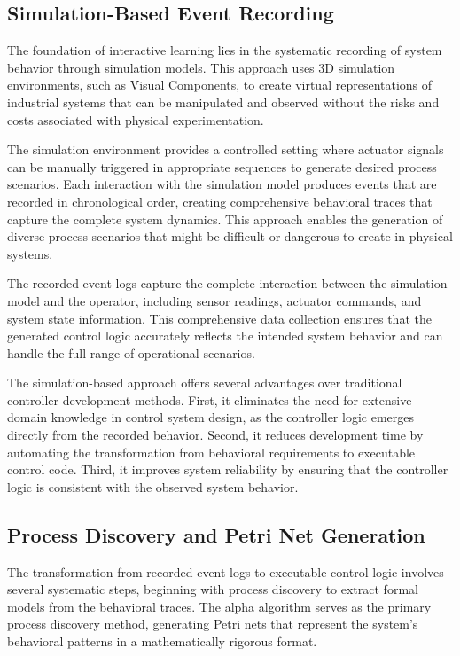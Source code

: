 \subsection{Simulation-Based Event Recording}

The foundation of interactive learning lies in the systematic recording of system behavior through simulation models. This approach uses 3D simulation environments, such as Visual Components, to create virtual representations of industrial systems that can be manipulated and observed without the risks and costs associated with physical experimentation.

The simulation environment provides a controlled setting where actuator signals can be manually triggered in appropriate sequences to generate desired process scenarios. Each interaction with the simulation model produces events that are recorded in chronological order, creating comprehensive behavioral traces that capture the complete system dynamics. This approach enables the generation of diverse process scenarios that might be difficult or dangerous to create in physical systems.



The recorded event logs capture the complete interaction between the simulation model and the operator, including sensor readings, actuator commands, and system state information. This comprehensive data collection ensures that the generated control logic accurately reflects the intended system behavior and can handle the full range of operational scenarios.

The simulation-based approach offers several advantages over traditional controller development methods. First, it eliminates the need for extensive domain knowledge in control system design, as the controller logic emerges directly from the recorded behavior. Second, it reduces development time by automating the transformation from behavioral requirements to executable control code. Third, it improves system reliability by ensuring that the controller logic is consistent with the observed system behavior.

\subsection{Process Discovery and Petri Net Generation}

The transformation from recorded event logs to executable control logic involves several systematic steps, beginning with process discovery to extract formal models from the behavioral traces. The alpha algorithm serves as the primary process discovery method, generating Petri nets that represent the system's behavioral patterns in a mathematically rigorous format.

